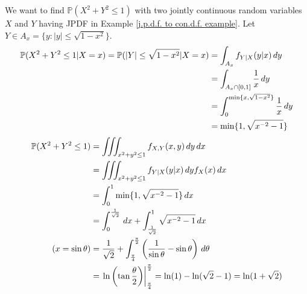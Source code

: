 \documentclass{huhtakm-template-book}
\newcommand{\prob}{\mathbb{P}}
\begin{document}
    \begin{eg}
        We want to find $\prob(X^{2}+Y^{2}\leq 1)$ with two jointly continuous random variables $X$ and $Y$ having JPDF in Example \ref{j.p.d.f. to con.d.f. example}. Let $Y\in A_{x}=\{y:|y|\leq\sqrt{1-x^{2}}\}$.
        \begin{align*}
            \prob(X^{2}+Y^{2}\leq 1|X=x)=\prob(|Y|\leq\sqrt{1-x^{2}}|X=x)&=\int_{A_{x}}f_{Y|X}(y|x)\,dy\\
            &=\int_{A_{x}\cap[0,1]}\frac{1}{x}\,dy\\
            &=\intlu{0}{\min\{x,\sqrt{1-x^{2}}\}}\frac{1}{x}\,dy\\
            &=\min\{1,\sqrt{x^{-2}-1}\}
        \end{align*}
        \begin{align*}
            \prob(X^{2}+Y^{2}\leq 1)&=\iiint_{x^{2}+y^{2}\leq 1}f_{X,Y}(x,y)\,dy\,dx\\
            &=\iiint_{x^{2}+y^{2}\leq 1}f_{Y|X}(y|x)\,dy f_{X}(x)\,dx\\
            &=\intlu{0}{1}\min\{1,\sqrt{x^{-2}-1}\}\,dx\\
            &=\intlu{0}{\frac{1}{\sqrt{2}}}\,dx+\intlu{\frac{1}{\sqrt{2}}}{1}\sqrt{x^{-2}-1}\,dx\\
            \tag{$x=\sin\theta$}
            &=\frac{1}{\sqrt{2}}+\intlu{\frac{\pi}{4}}{\frac{\pi}{2}}\left(\frac{1}{\sin\theta}-\sin\theta\right)\,d\theta\\
            &=\left.\ln\left(\tan\frac{\theta}{2}\right)\right|_{\frac{\pi}{4}}^{\frac{\pi}{2}}=\ln(1)-\ln(\sqrt{2}-1)=\ln(1+\sqrt{2})
        \end{align*}
    \end{eg}
\end{document}
